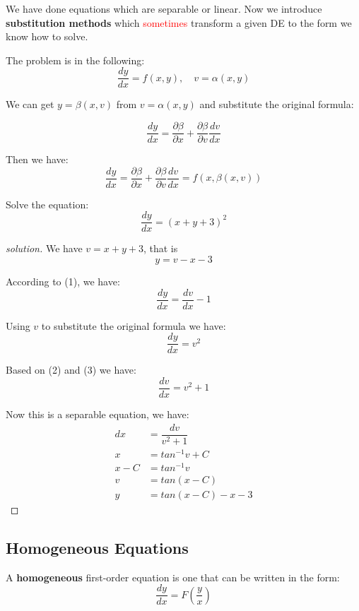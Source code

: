 We have done equations which are separable or linear.
Now we introduce \textbf{substitution methods}  which \textcolor{red}{sometimes} transform a given DE to the form we know how to solve.

\begin{example}
    The problem is in the following:
    \[
        \dfrac{dy}{dx} = f(x, y), \quad v = \alpha(x, y)
    \]

    We can get \(y = \beta(x, v)\)  from \(v = \alpha(x, y)\) and substitute the original formula:

    \[
        \dfrac{dy}{dx} = \frac{\partial \beta}{\partial x} + \frac{\partial \beta}{\partial v}  \dfrac{dv}{dx} 
    \]

    Then we have:
    \[
        \dfrac{dy}{dx} 
        = 
        \frac{\partial \beta}{\partial x} + \frac{\partial \beta}{\partial v}  \dfrac{dv}{dx} 
        =
        f(x, \beta(x, v))
    \]
\end{example}


\begin{example}
    Solve the equation:
    \[
        \dfrac{dy}{dx} = (x + y + 3)^2
    \]
\end{example}
\begin{proof}[solution]
    We have \(v = x + y + 3\), that is 
    \[
        y = v - x- 3 \tag{1} 
    \]
    
    According to (1), we have:
    \[
        \dfrac{dy}{dx} = \dfrac{dv}{dx} - 1 \tag{2}
    \]

    Using \(v\) to substitute the original formula we have:
    \[
        \dfrac{dy}{dx} = v ^ 2 \tag{3}
    \]

    Based on (2) and (3) we have:
    \[
        \dfrac{dv}{dx} = v^2 + 1
    \]

    Now this is a separable equation, we have:
    \begin{align*}
        dx &= \dfrac{dv}{v^2 + 1}  \\
        x &= tan^{-1} v + C \\
        x - C &= tan^{-1} v \\
        v &=  tan(x - C) \\
        y &= tan(x -C) - x- 3
    \end{align*}
\end{proof}

\subsection{Homogeneous Equations}
\begin{definition}
    A \textbf{homogeneous} first-order equation is one that can be written in the form:
    \[
        \dfrac{dy}{dx} = F(\dfrac{y}{x})
    \]
\end{definition}


